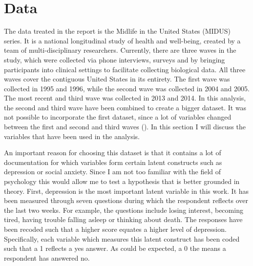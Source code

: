 \documentclass[11pt]{article}
\begin{document}
\section{Data}

The data treated in the report is the Midlife in the United States (MIDUS)
series. It is a national longitudinal study of health and well-being, created by
a team of multi-disciplinary researchers. Currently, there are three waves in
the study, which were collected via phone interviews, surveys and by bringing
participants into clinical settings to facilitate collecting biological data.
All three waves cover the contiguous United States in its entirety. The first wave
was collected in 1995 and 1996, while the second wave was collected in 2004 and
2005. The most recent and third wave was collected in 2013 and 2014. In this
analysis, the second and third wave have been combined to create a bigger dataset.
It was not possible to incorporate the first dataset, since a lot of variables
changed between the first and second and third waves (\cite{radler2014}). In this
section I will discuss the variables that have been used in the analysis.

An important reason for choosing this dataset is that it contains a lot of
documentation for which variables form certain latent constructs such as
depression or social anxiety. Since I am not too familiar with the field of
psychology this would allow me to test a hypothesis that is better grounded in
theory. First, depression is the most important latent variable in this work. It
has been measured through seven questions during which the respondent reflects
over the last two weeks. For example, the questions include losing interest,
becoming tired, having trouble falling asleep or thinking about death. The
responses have been recoded such that a higher score equates a higher level of
depression. Specifically, each variable which measures this latent construct has
been coded such that a 1 reflects a yes answer. As could be expected, a 0 the
means a respondent has answered no.
\end{document}
